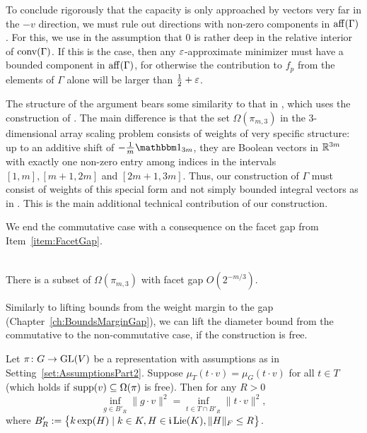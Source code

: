 To conclude rigorously that the capacity is only approached by vectors very far in the $-v$ direction, we must rule out directions with non-zero components in $\operatorname{aff}(\Gamma)$. For this, we use in \cite{WeightMargin} the assumption that $0$ is rather deep in the relative interior of $\operatorname{conv}(\Gamma)$. If this is the case, then any $\varepsilon$-approximate minimizer must have a bounded component in $\operatorname{aff}(\Gamma)$, for otherwise the contribution to $f_p$ from the elements of $\Gamma$ alone will be larger than $\frac{1}{2} + \varepsilon$.

\begin{remark}\label{rem:CommutativeDiameter}
	The structure of the argument bears some similarity to that in \cite{straszak2019computing}, which uses the construction of \cite{alon1997anti}. The main difference is that the set $\Omega(\pi_{m,3})$ in the 3-dimensional array scaling problem consists of weights of very specific structure: up to an additive shift of $-\frac{1}{m} \ones_{3m}$, they are Boolean vectors in $\mathbb R^{3m}$ with exactly one non-zero entry among indices in the intervals $[1,m], [m+1,2m]$ and $[2m + 1, 3m]$.
	Thus, our construction of $\Gamma$ must consist of weights of this special form and not simply bounded integral vectors as in \cite{straszak2019computing}. This is the main additional technical contribution of our construction.  
	\hfill\remSymbol
\end{remark}

We end the commutative case with a consequence on the facet gap from Item~\ref{item:FacetGap}.

\begin{cor} \label{cor:facet-fap}
	\ \\
	There is a subset of $\Omega(\pi_{m,3})$ with facet gap $O(2^{- m/3})$.
\end{cor}

Similarly to lifting bounds from the weight margin to the gap (Chapter~\ref{ch:BoundsMarginGap}), we can lift the diameter bound from the commutative to the non-commutative case, if the construction is free.

\begin{theorem} \label{thm:free-diameter}
	Let $\pi \colon G \to \operatorname{GL}(V)$ be a representation with assumptions as in Setting~\ref{set:AssumptionsPart2}.
	Suppose $\mu_{T}(t \cdot v) = \mu_G(t \cdot v)$ for all $t \in T$ (which holds if $\operatorname{supp}(v) \subseteq \Omega(\pi)$ is free). Then for any $R > 0$
		\begin{equation}\label{eq:LiftDiameter}
			\inf_{g \in B'_R} \|g \cdot v\|^2 = \inf_{t \in T \cap B'_R} \|t \cdot v\|^2 ,
		\end{equation}
	where $B'_R := \big\{ k \exp(H) \mid k \in K, H \in \mathfrak{i} \operatorname{Lie}(K), \|H\|_F \leq R \big\}$.
\end{theorem}

